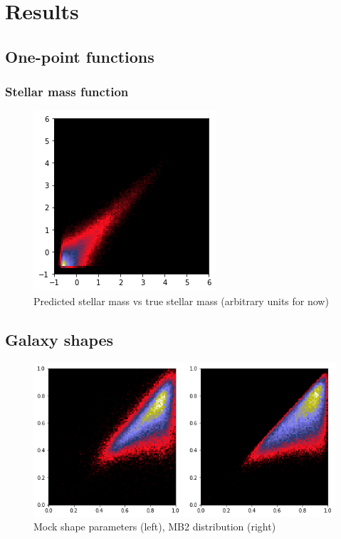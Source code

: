 \documentclass[a4paper,fleqn,usenatbib]{mnras}
\begin{document}
\section{Results}

\subsection{One-point functions}

	\subsubsection{Stellar mass function}

\begin{figure}
    \centering
    \includegraphics[width=0.5\columnwidth]{Figures/mStar_pred}
    \caption{Predicted stellar mass vs true stellar mass (arbitrary units for now)}
    \label{fig:my_label}
\end{figure}

	\subsection{Galaxy shapes}

\begin{figure}
    \centering
    \includegraphics[width=\columnwidth]{Figures/qs_plot}
    \caption{Mock shape parameters (left), MB2 distribution (right)}
    \label{fig:my_label}
\end{figure}
\end{document}
